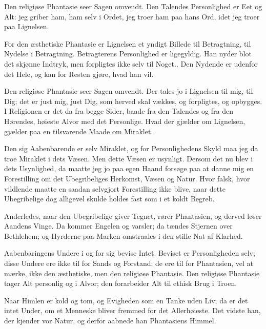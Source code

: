 \documentclass[12pt,a4paper]{book}
\newcommand{\apage}[1]{\marginnote{\footnotesize\textit{[#1]}}}
\begin{document}
Den religiøse Phantasie seer Sagen omvendt. Den Talendes Personlighed er Eet
og Alt: jeg griber ham, ham selv i Ordet, jeg troer ham paa hans Ord, idet jeg
troer paa Lignelsen.

For den æsthetiske Phantasie er Lignelsen et yndigt Billede til Betragtning,
til Nydelse i Betragtning. Betragterens Personlighed er ligegyldig. Han
nyder blot det skjønne Indtryk, men forpligtes ikke selv til Noget..
Den Nydende er udenfor det Hele, og kan for Resten gjøre, hvad han vil.

Den religiøse Phantasie seer Sagen omvendt. Der tales jo i Lignelsen til mig,
til Dig; det er just mig, just Dig, som herved skal vækkes, og forpligtes, og
opbygges. I Religionen er det da fra begge Sider, baade fra den Talendes og
fra den Hørendes, høieste Alvor med det Personlige. Hvad der gjælder om
Lignelsen, gjælder paa en tilsvarende Maade om Miraklet.

Den sig Aabenbarende er selv Miraklet, og for Personlighedens Skyld maa jeg
da troe Miraklet i dets Væsen. Men dette Væsen er usynligt. Dersom det nu
blev i dets Usynlighed, da maatte jeg jo paa egen Haand forsøge paa at danne
mig en Forestilling om det Ubegribeliges Herkomst, Væsen og Natur. Hvor
falsk, hvor vildlende maatte en saadan selvgjort Forestilling ikke blive,
naar dette Ubegribelige dog alligevel skulde holdes fast som i et koldt
Begreb.
 \apage{20}

Anderledes, naar den Ubegribelige giver Tegnet, rører Phantasien, og derved
løser Aandens Vinge. Da kommer Engelen og varsler; da tændes Stjernen over
Bethlehem; og Hyrderne paa Marken omstraales i den stille Nat af Klarhed.

Aabenbaringens Undere i og for sig bevise Intet. Beviset er Personligheden
selv; disse Undere ere ikke til for Sands og Forstand; de ere til for
Phantasien, vel at mærke, ikke den æsthetiske, men den religiøse Phantasie.
Den religiøse Phantasie tager Alt personlig og i Alvor; den forarbeider Alt
til ethisk Brug i Troen.

Naar Himlen er kold og tom, og Evigheden som en Tanke uden Liv; da er det
intet Under, om et Menneske bliver fremmed for det Allerhøieste. Det vidste
han, der kjender vor Natur, og derfor aabnede han Phantasiens Himmel.
\end{document}
